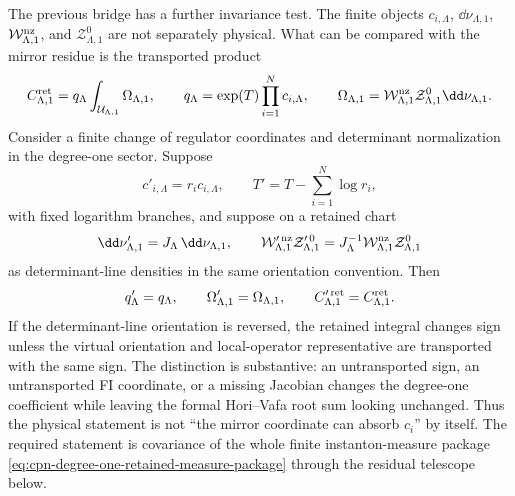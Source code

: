 \begin{remark}
\label{rem:cpn-degree-one-measure-scheme-covariance}
The previous bridge has a further invariance test.  The finite objects
\(c_{i,\Lambda}\), \(\dd\nu_{\Lambda,1}\),
\(\mathcal W_{\Lambda,1}^{\rm nz}\), and
\(\mathcal Z_{\Lambda,1}^{0}\) are not separately physical.  What can be
compared with the mirror residue is the transported product
\begin{equation}
  C_{\Lambda,1}^{\rm ret}
  =
  q_\Lambda
  \int_{\mathcal U_{\Lambda,1}}
  \Omega_{\Lambda,1},
  \qquad
  q_\Lambda=\exp(T)\prod_{i=1}^N c_{i,\Lambda},
  \qquad
  \Omega_{\Lambda,1}
  =
  \mathcal W_{\Lambda,1}^{\rm nz}
  \mathcal Z_{\Lambda,1}^{0}\dd\nu_{\Lambda,1}.
  \label{eq:cpn-degree-one-retained-measure-package}
\end{equation}
Consider a finite change of regulator coordinates and determinant
normalization in the degree-one sector.  Suppose
\[
  c'_{i,\Lambda}=r_i c_{i,\Lambda},\qquad
  T'=T-\sum_{i=1}^N\log r_i,
\]
with fixed logarithm branches, and suppose on a retained chart
\[
  \dd\nu'_{\Lambda,1}=J_\Lambda\,\dd\nu_{\Lambda,1},
  \qquad
  \mathcal W_{\Lambda,1}^{\prime\,{\rm nz}}
  \mathcal Z_{\Lambda,1}^{\prime\,0}
  =
  J_\Lambda^{-1}
  \mathcal W_{\Lambda,1}^{\rm nz}
  \mathcal Z_{\Lambda,1}^{0}
\]
as determinant-line densities in the same orientation convention.  Then
\begin{equation}
  q'_\Lambda=q_\Lambda,\qquad
  \Omega'_{\Lambda,1}=\Omega_{\Lambda,1},\qquad
  C_{\Lambda,1}^{\prime\,{\rm ret}}=C_{\Lambda,1}^{\rm ret}.
  \label{eq:cpn-degree-one-measure-scheme-invariance}
\end{equation}
If the determinant-line orientation is reversed, the retained integral changes
sign unless the virtual orientation and local-operator representative are
transported with the same sign.  The distinction is substantive: an
untransported sign, an untransported FI coordinate, or a missing Jacobian
changes the degree-one coefficient while leaving the formal Hori--Vafa root sum
looking unchanged.  Thus the physical statement is not ``the mirror coordinate can
absorb \(c_i\)'' by itself.  The required statement is covariance of the whole
finite instanton-measure package
\eqref{eq:cpn-degree-one-retained-measure-package} through the residual
telescope below.
\end{remark}


